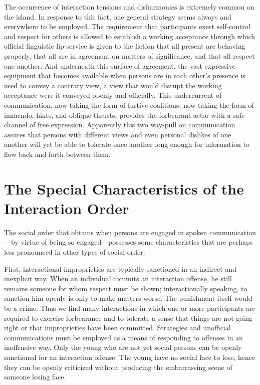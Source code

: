 \documentclass[openany,nobib]{tufte-book}
\begin{document}
The occurrence of interaction tensions and disharmonies is extremely
common on the island. In response to this fact, one general strategy
seems always and everywhere to be employed. The requirement that
participants exert self-control and respect for others is allowed to
establish a working acceptance through which official linguistic
lip-service is given to the fiction that all present are behaving
properly, that all are in agreement on matters of significance, and that
all respect one another. And underneath this surface of agreement, the
vast expressive equipment that becomes available when persons are in
each other's presence is used to convey a contrary view, a view that
would disrupt the working acceptance were it conveyed openly and
officially. This undercurrent of communication, now taking the form of
furtive coalitions, now taking the form of innuendo, hints, and oblique
thrusts, provides the forbearant actor with a safe channel of free
expression. Apparently this two way-pull on communication assures that
persons with different views and even personal dislikes of one another
will yet be able to tolerate once another long enough for information to
flow back and forth between them.

\hypertarget{the-special-characteristics-of-the-interaction-order}{%
\section{The Special Characteristics of the\\\noindent Interaction
Order}\label{the-special-characteristics-of-the-interaction-order}}

The social order that obtains when persons are engaged in spoken
communication---by virtue of being so engaged---possesses some
characteristics that are perhaps less pronounced in other types of
social order.

\enlargethispage{\baselineskip}

First, interactional improprieties are typically sanctioned in an
indirect and inexplicit way. When an individual commits an interaction
offense, he still remains someone for whom respect must be shown;
interactionally speaking, to sanction him openly is only to make matters
worse. The punishment itself would be a crime. Thus we find many
interactions in which one or more participants are required to exercise
forbearance and to tolerate a sense that things are not going right or
that improprieties have been committed. Strategies and unofficial
communications must be employed as a means of responding to offenses in
an inoffensive way. Only the young who are not yet social persons can be
openly sanctioned for an interaction offense. The young have no social
face to lose, hence they can be openly criticized without producing the
embarrassing scene of someone losing face.
\end{document}
